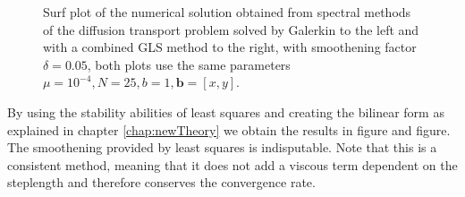 \begin{figure}[h]
\begin{subfigure}[b]{0.48\textwidth}
  \end{subfigure}
  \vspace{-0.1\baselineskip}
  \caption{Surf plot of the numerical solution obtained from spectral methods of the diffusion transport problem solved by Galerkin to the left and with a combined GLS method to the right, with smoothening factor $\delta = 0.05$, both plots use the same parameters $\mu = 10^{-4}, N=25,b = 1,\mathbf{b} = [x,y]$.}
  \label{fig:SurfDiffTransPositive}
\end{figure}
%

By using the stability abilities of least squares and creating the bilinear form as explained in chapter \ref{chap:newTheory} we obtain the results in figure and figure. The smoothening provided by least squares is indisputable. Note that this is a consistent method, meaning that it does not add a viscous term dependent on the steplength and therefore conserves the convergence rate. 

